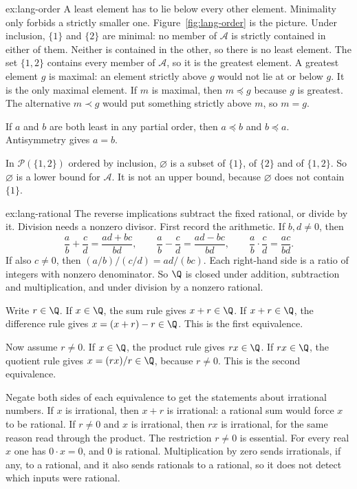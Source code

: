 \begin{solution}{ex:lang-order}
\idea A least element has to lie below every other element. Minimality only forbids a strictly smaller one. Figure~\ref{fig:lang-order} is the picture.
\writeup Under inclusion, $\{1\}$ and $\{2\}$ are minimal: no member of $\mathcal A$ is strictly contained in either of them. Neither is contained in the other, so there is no least element. The set $\{1,2\}$ contains every member of $\mathcal A$, so it is the greatest element. A greatest element $g$ is maximal: an element strictly above $g$ would not lie at or below $g$. It is the only maximal element. If $m$ is maximal, then $m\preceq g$ because $g$ is greatest. The alternative $m\prec g$ would put something strictly above $m$, so $m=g$.

If $a$ and $b$ are both least in any partial order, then $a\preceq b$ and $b\preceq a$. Antisymmetry gives $a=b$.

In $\mathcal P(\{1,2\})$ ordered by inclusion, $\varnothing$ is a subset of $\{1\}$, of $\{2\}$ and of $\{1,2\}$. So $\varnothing$ is a lower bound for $\mathcal A$. It is not an upper bound, because $\varnothing$ does not contain $\{1\}$.
\end{solution}

\begin{solution}{ex:lang-rational}
\idea The reverse implications subtract the fixed rational, or divide by it. Division needs a nonzero divisor.
\writeup First record the arithmetic. If $b,d\ne 0$, then
\[
\frac{a}{b}+\frac{c}{d}=\frac{ad+bc}{bd},\qquad
\frac{a}{b}-\frac{c}{d}=\frac{ad-bc}{bd},\qquad
\frac{a}{b}\cdot\frac{c}{d}=\frac{ac}{bd}.
\]
If also $c\ne 0$, then $(a/b)/(c/d)=ad/(bc)$. Each right-hand side is a ratio of integers with nonzero denominator. So $\Q$ is closed under addition, subtraction and multiplication, and under division by a nonzero rational.

Write $r\in\Q$. If $x\in\Q$, the sum rule gives $x+r\in\Q$. If $x+r\in\Q$, the difference rule gives $x=(x+r)-r\in\Q$. This is the first equivalence.

Now assume $r\ne 0$. If $x\in\Q$, the product rule gives $rx\in\Q$. If $rx\in\Q$, the quotient rule gives $x=(rx)/r\in\Q$, because $r\ne 0$. This is the second equivalence.

Negate both sides of each equivalence to get the statements about irrational numbers. If $x$ is irrational, then $x+r$ is irrational: a rational sum would force $x$ to be rational. If $r\ne 0$ and $x$ is irrational, then $rx$ is irrational, for the same reason read through the product. The restriction $r\ne 0$ is essential. For every real $x$ one has $0\cdot x=0$, and $0$ is rational. Multiplication by zero sends irrationals, if any, to a rational, and it also sends rationals to a rational, so it does not detect which inputs were rational.
\end{solution}

